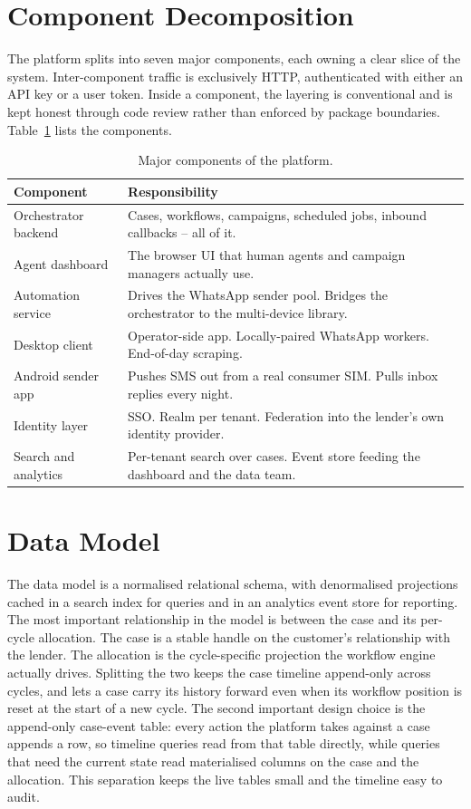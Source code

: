 \section{Component Decomposition}

The platform splits into seven major components, each owning a clear slice of the system. Inter-component traffic is exclusively HTTP, authenticated with either an API key or a user token. Inside a component, the layering is conventional and is kept honest through code review rather than enforced by package boundaries. Table~\ref{tab:components} lists the components.

\begin{table}[H]
\centering
\caption{Major components of the platform.}
\label{tab:components}
\begin{tabularx}{\textwidth}{l X}
\toprule
\textbf{Component} & \textbf{Responsibility} \\
\midrule
Orchestrator backend & Cases, workflows, campaigns, scheduled jobs, inbound callbacks -- all of it. \\
Agent dashboard     & The browser UI that human agents and campaign managers actually use. \\
Automation service  & Drives the WhatsApp sender pool. Bridges the orchestrator to the multi-device library. \\
Desktop client      & Operator-side app. Locally-paired WhatsApp workers. End-of-day scraping. \\
Android sender app  & Pushes SMS out from a real consumer SIM. Pulls inbox replies every night. \\
Identity layer      & SSO. Realm per tenant. Federation into the lender's own identity provider. \\
Search and analytics & Per-tenant search over cases. Event store feeding the dashboard and the data team. \\
\bottomrule
\end{tabularx}
\end{table}

\section{Data Model}

The data model is a normalised relational schema, with denormalised projections cached in a search index for queries and in an analytics event store for reporting. The most important relationship in the model is between the case and its per-cycle allocation. The case is a stable handle on the customer's relationship with the lender. The allocation is the cycle-specific projection the workflow engine actually drives. Splitting the two keeps the case timeline append-only across cycles, and lets a case carry its history forward even when its workflow position is reset at the start of a new cycle. The second important design choice is the append-only case-event table: every action the platform takes against a case appends a row, so timeline queries read from that table directly, while queries that need the current state read materialised columns on the case and the allocation. This separation keeps the live tables small and the timeline easy to audit.

